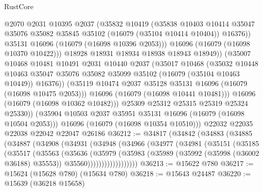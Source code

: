 \begin{lexlean}{RustCore}
\begin{coremodule}
                    @2070
                    @2031
                    @10395
                    @2037
                    (@35832
                      @10419
                      (@35838
                        @10403
                        @10414
                        @35047
                        @35076
                        @35082
                        @35845
                        @35102
                        (@16079 (@35104 @10414 @10404))
                        @16376))
                    @35131
                    @16096
                    (@16079 (@16098 @10396 @2053)))
                  @16096
                  (@16079 (@16098 @10370 @10422)))
                @18928
                @18931
                @18934
                @18938
                @18943
                @18949))
            (@35007
              @10468
              @10481
              @10491
              @2031
              @10440
              @2037
              (@35017
                @10468
                (@35032
                  @10448
                  @10463
                  @35047
                  @35076
                  @35082
                  @35099
                  @35102
                  (@16079 (@35104 @10463 @10449))
                  @16376))
              (@35119 @10474 @2037 @35128 @35131 @16096 (@16079 (@16098 @10475 @2053)))
              @16096
              (@16079 (@16098 @10441 @10481)))
            @16096
            (@16079 (@16098 @10362 @10482)))
          @25309
          @25312
          @25315
          @25319
          @25324
          @25330))
      (@35904 @10503 @2037 @35951 @35131 @16096 (@16079 (@16098 @10504 @2053)))
      @16096
      (@16079 (@16098 @10354 @10510)))
    @22032
    @22035
    @22038
    @22042
    @22047
    @26186
@36212 := @34817
    (@34842
      (@34883
        (@34885
          (@34887
            (@34908
              (@34931
                (@34948
                  (@34966
                    (@34977
                      (@34981
                        (@35151
                          (@35185
                            (@35517
                              (@35563
                                (@35636
                                  (@35979
                                    (@35983
                                      (@35989
                                        (@35992 (@35998 (@36002 @36188) @35553))
                                        @35560))))))))))))))))))
@36213 := @15622 @780
@36217 := @15624 (@15628 @780) (@15634 @780)
@36218 := @15643 @24487
@36220 := @15639 (@36218 @15658)

\end{coremodule}
\end{lexlean}
